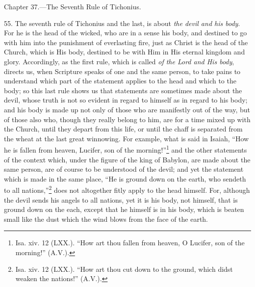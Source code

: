 
Chapter 37.—The Seventh Rule of Tichonius.

55. The seventh rule of Tichonius and the last, is about \emph{the devil and his body}. For he is the head of the wicked, who are in a sense his body, and destined to go with him into the punishment of everlasting fire, just as Christ is the head of the Church, which is His body, destined to be with Him in His eternal kingdom and glory. Accordingly, as the first rule, which is called \emph{of the Lord and His body}, directs us, when Scripture speaks of one and the same person, to take pains to understand which part of the statement applies to the head and which to the body; so this last rule shows us that statements are sometimes made about the devil, whose truth is not so evident in regard to himself as in regard to his body; and his body is made up not only of those who are manifestly out of the way, but of those also who, though they really belong to him, are for a time mixed up with the Church, until they depart from this life, or until the chaff is separated from the wheat at the last great winnowing. For example, what is said in Isaiah, “How he is fallen from heaven, Lucifer, son of the morning!”\footnote{Isa. xiv. 12 (LXX.). “How art thou fallen from heaven, O Lucifer, son of the morning!” (A.V.).} and the other statements of the context which, under the figure of the king of Babylon, are made about the same person, are of course to be understood of the devil; and yet the statement which is made in the same place, “He is ground down on the earth, who sendeth to all nations,”\footnote{Isa. xiv. 12 (LXX.). “How art thou cut down to the ground, which didst weaken the nations!” (A.V.).} does not altogether fitly apply to the head himself. For, although the devil sends his angels to all nations, yet it is his body, not himself, that is ground down on the each, except that he himself is in his body, which is beaten small like the dust which the wind blows from the face of the earth.

